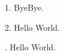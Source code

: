 \def\ta{Bye}
\def\tb{Bye}
1. \ta\tb.\par
\begingroup
\def\ta{Hello}
\gdef\tb{ World}
2. \ta\tb.\par
{}. \ta\tb.\par
\bye
